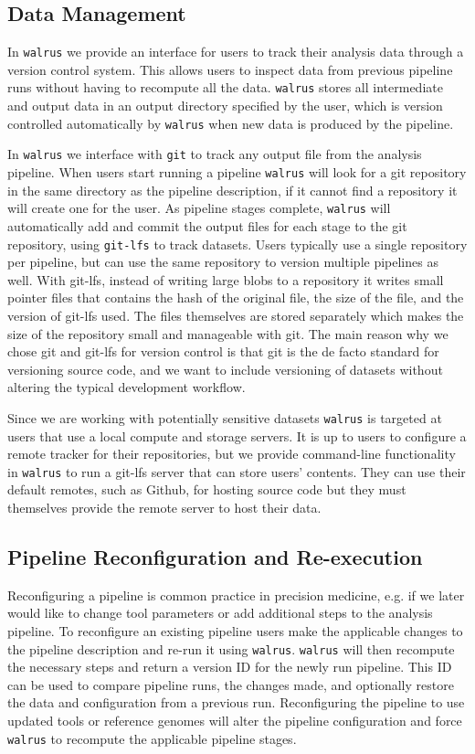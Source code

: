 \subsection{Data Management}
In \texttt{walrus} we provide an interface for users to track their analysis
data through a version control system. This allows users to inspect data from
previous pipeline runs without having to recompute all the data. \texttt{walrus}
stores all intermediate and output data in an output directory specified by the
user, which is version controlled automatically by \texttt{walrus} when new data
is produced by the pipeline. 

In \texttt{walrus} we interface with \texttt{git} to track any output file from
the analysis pipeline. When users start running a pipeline \texttt{walrus} will
look for a git repository in the same directory as the pipeline description, if
it cannot find a repository it will create one for the user. As pipeline stages
complete, \texttt{walrus} will automatically add and commit the output files for
each stage to the git repository, using \texttt{git-lfs} to track datasets.
Users typically use a single repository per pipeline, but can use the same
repository to version multiple pipelines as well. With git-lfs, instead of
writing large blobs to a repository it writes small pointer files that contains
the hash of the original file, the size of the file, and the version of git-lfs
used. The files themselves are stored separately which makes the size of the
repository small and manageable with git. The main reason why we chose git and
git-lfs for version control is that git is the de facto standard for versioning
source code, and we want to include versioning of datasets without altering the
typical development workflow. 

Since we are working with potentially sensitive datasets \texttt{walrus} is
targeted at users that use a local compute and storage servers. It is up to
users to configure a remote tracker for their repositories, but we provide
command-line functionality in \texttt{walrus} to run a git-lfs server that can
store users' contents.  They can use their default remotes, such as Github, for
hosting source code but they must themselves provide the remote server to host
their data.

\subsection{Pipeline Reconfiguration and Re-execution}
Reconfiguring a pipeline is common practice in precision medicine, e.g. if we
later would like to change tool parameters or add additional steps to the
analysis pipeline. To reconfigure an existing pipeline users make the applicable
changes to the pipeline description and re-run it using \texttt{walrus}.
\texttt{walrus} will then recompute the necessary steps and return a version ID
for the newly run pipeline. This ID can be used to compare pipeline runs, the
changes made, and optionally restore the data and configuration from a previous
run.  Reconfiguring the pipeline to use updated tools or reference genomes will
alter the pipeline configuration and force \texttt{walrus} to recompute the
applicable pipeline stages. 

